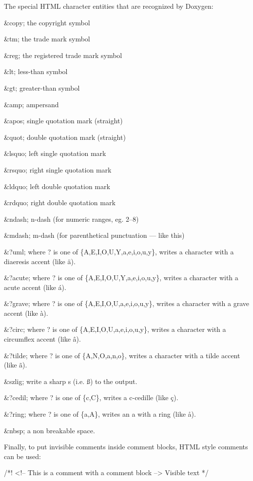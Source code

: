 The special HTML character entities that are recognized by Doxygen:


\begin{DoxyItemize}
\item {\ttfamily \&copy;} the copyright symbol 
\item {\ttfamily \&tm;} the trade mark symbol 
\item {\ttfamily \&reg;} the registered trade mark symbol 
\item {\ttfamily \&lt;} less-\/than symbol 
\item {\ttfamily \&gt;} greater-\/than symbol 
\item {\ttfamily \&amp;} ampersand 
\item {\ttfamily \&apos;} single quotation mark (straight) 
\item {\ttfamily \&quot;} double quotation mark (straight) 
\item {\ttfamily \&lsquo;} left single quotation mark 
\item {\ttfamily \&rsquo;} right single quotation mark 
\item {\ttfamily \&ldquo;} left double quotation mark 
\item {\ttfamily \&rdquo;} right double quotation mark 
\item {\ttfamily \&ndash;} n-\/dash (for numeric ranges, eg. 2--8) 
\item {\ttfamily \&mdash;} m-\/dash (for parenthetical punctuation --- like this) 
\item {\ttfamily \&?uml;} where ? is one of \{A,E,I,O,U,Y,a,e,i,o,u,y\}, writes a character with a diaeresis accent (like \"{a}). 
\item {\ttfamily \&?acute;} where ? is one of \{A,E,I,O,U,Y,a,e,i,o,u,y\}, writes a character with a acute accent (like \'{a}). 
\item {\ttfamily \&?grave;} where ? is one of \{A,E,I,O,U,a,e,i,o,u,y\}, writes a character with a grave accent (like \`{a}). 
\item {\ttfamily \&?circ;} where ? is one of \{A,E,I,O,U,a,e,i,o,u,y\}, writes a character with a circumflex accent (like \^{a}). 
\item {\ttfamily \&?tilde;} where ? is one of \{A,N,O,a,n,o\}, writes a character with a tilde accent (like \~{a}). 
\item {\ttfamily \&szlig;} write a sharp s (i.e. {\ss}) to the output. 
\item {\ttfamily \&?cedil;} where ? is one of \{c,C\}, writes a c-\/cedille (like \c{c}). 
\item {\ttfamily \&?ring;} where ? is one of \{a,A\}, writes an {\ttfamily a} with a ring (like \aa). 
\item {\ttfamily \&nbsp;} a non breakable space. 
\end{DoxyItemize}

Finally, to put invisible comments inside comment blocks, HTML style comments can be used: \begin{DoxyVerb}
/*! <!-- This is a comment with a comment block --> Visible text */
\end{DoxyVerb}
 